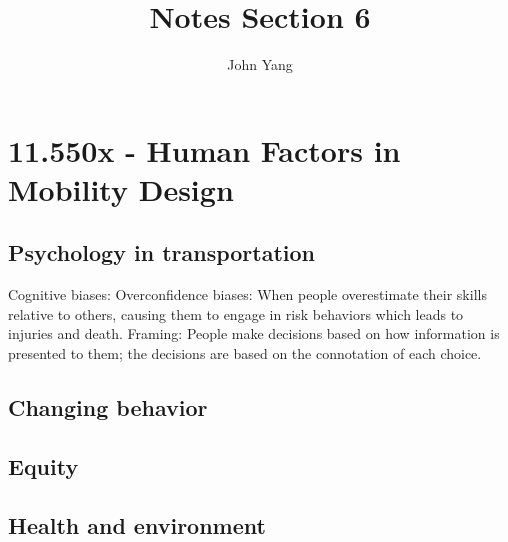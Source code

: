 \documentclass{article}
\title{Notes Section 6} %
\author{John Yang}
\begin{document}
    \maketitle
    \tableofcontents
    \section{11.550x - Human Factors in Mobility Design}
    \subsection{Psychology in transportation}
    \begin{outline}
        \1 Cognitive biases:
            \2 Overconfidence biases: When people overestimate their skills relative to others, causing them to engage in risk behaviors which leads to injuries and death. 
            \2 Framing: People make decisions based on how information is presented to them; the decisions are based on the connotation of each choice. 
    \end{outline}
    \subsection{Changing behavior}
    \begin{outline}
        \1 
    \end{outline}
    \subsection{Equity}
    \begin{outline}
        \1 
    \end{outline}
    \subsection{Health and environment}
    \begin{outline}
        \1 
    \end{outline}
\end{document}
